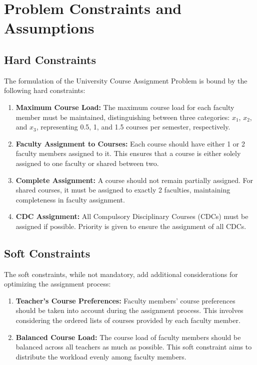 \documentclass{article}
\begin{document}
\newpage
{}
\section{Problem Constraints and Assumptions}

\subsection{Hard Constraints}

The formulation of the University Course Assignment Problem is bound by the following hard constraints:

\begin{enumerate}
    \item \textbf{Maximum Course Load:} The maximum course load for each faculty member must be maintained, distinguishing between three categories: $x_1$, $x_2$, and $x_3$, representing 0.5, 1, and 1.5 courses per semester, respectively.
    
    \item \textbf{Faculty Assignment to Courses:} Each course should have either 1 or 2 faculty members assigned to it. This ensures that a course is either solely assigned to one faculty or shared between two.
    
    \item \textbf{Complete Assignment:} A course should not remain partially assigned. For shared courses, it must be assigned to exactly 2 faculties, maintaining completeness in faculty assignment.
    
    \item \textbf{CDC Assignment:} All Compulsory Disciplinary Courses (CDCs) must be assigned if possible. Priority is given to ensure the assignment of all CDCs.
\end{enumerate}

\subsection{Soft Constraints}

The soft constraints, while not mandatory, add additional considerations for optimizing the assignment process:

\begin{enumerate}
    \item \textbf{Teacher's Course Preferences:} Faculty members' course preferences should be taken into account during the assignment process. This involves considering the ordered lists of courses provided by each faculty member.
    
    \item \textbf{Balanced Course Load:} The course load of faculty members should be balanced across all teachers as much as possible. This soft constraint aims to distribute the workload evenly among faculty members.
\end{enumerate}
\end{document}
